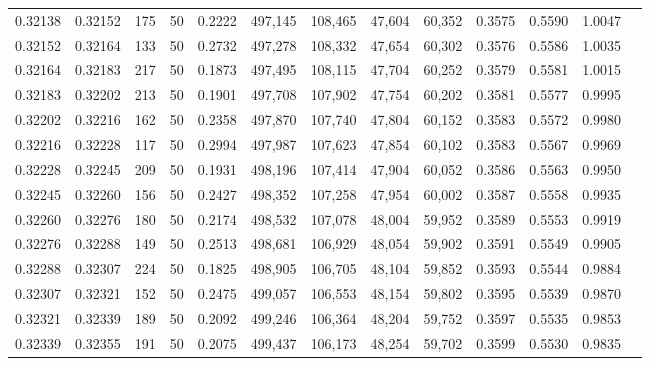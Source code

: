 \begin{tabular}{rrrrrrrrrrrrr}
0.32138 & 0.32152 &   175 &  50 &                                     0.2222 & 497,145 & 108,465 &  47,604 &  60,352 & 0.3575 & 0.5590 & 1.0047 \\
0.32152 & 0.32164 &   133 &  50 &                                     0.2732 & 497,278 & 108,332 &  47,654 &  60,302 & 0.3576 & 0.5586 & 1.0035 \\
0.32164 & 0.32183 &   217 &  50 &                                     0.1873 & 497,495 & 108,115 &  47,704 &  60,252 & 0.3579 & 0.5581 & 1.0015 \\
0.32183 & 0.32202 &   213 &  50 &                                     0.1901 & 497,708 & 107,902 &  47,754 &  60,202 & 0.3581 & 0.5577 & 0.9995 \\
0.32202 & 0.32216 &   162 &  50 &                                     0.2358 & 497,870 & 107,740 &  47,804 &  60,152 & 0.3583 & 0.5572 & 0.9980 \\
0.32216 & 0.32228 &   117 &  50 &                                     0.2994 & 497,987 & 107,623 &  47,854 &  60,102 & 0.3583 & 0.5567 & 0.9969 \\
0.32228 & 0.32245 &   209 &  50 &                                     0.1931 & 498,196 & 107,414 &  47,904 &  60,052 & 0.3586 & 0.5563 & 0.9950 \\
0.32245 & 0.32260 &   156 &  50 &                                     0.2427 & 498,352 & 107,258 &  47,954 &  60,002 & 0.3587 & 0.5558 & 0.9935 \\
0.32260 & 0.32276 &   180 &  50 &                                     0.2174 & 498,532 & 107,078 &  48,004 &  59,952 & 0.3589 & 0.5553 & 0.9919 \\
0.32276 & 0.32288 &   149 &  50 &                                     0.2513 & 498,681 & 106,929 &  48,054 &  59,902 & 0.3591 & 0.5549 & 0.9905 \\
0.32288 & 0.32307 &   224 &  50 &                                     0.1825 & 498,905 & 106,705 &  48,104 &  59,852 & 0.3593 & 0.5544 & 0.9884 \\
0.32307 & 0.32321 &   152 &  50 &                                     0.2475 & 499,057 & 106,553 &  48,154 &  59,802 & 0.3595 & 0.5539 & 0.9870 \\
0.32321 & 0.32339 &   189 &  50 &                                     0.2092 & 499,246 & 106,364 &  48,204 &  59,752 & 0.3597 & 0.5535 & 0.9853 \\
0.32339 & 0.32355 &   191 &  50 &                                     0.2075 & 499,437 & 106,173 &  48,254 &  59,702 & 0.3599 & 0.5530 & 0.9835 \\

\end{tabular}
